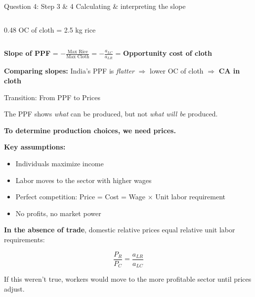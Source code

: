 \documentclass{beamer}
\begin{document}
\begin{frame}{Question 4: Step 3 \& 4 Calculating \& interpreting the slope}
\begin{columns}[T]
\begin{column}{0.48\textwidth}
\small{OC of cloth = 2.5 kg rice}
\end{column}
\end{columns}

\vspace{0.3cm}

\textbf{Slope of PPF} = $-\frac{\text{Max Rice}}{\text{Max Cloth}} = -\frac{a_{LC}}{a_{LR}}$ = \textbf{Opportunity cost of cloth}

\vspace{0.2cm}

\textbf{Comparing slopes:} India's PPF is \textit{flatter} $\Rightarrow$ lower OC of cloth $\Rightarrow$ \textbf{CA in cloth}

\end{frame}




\begin{frame}{Transition: From PPF to Prices}

The PPF shows \textit{what} can be produced, but not \textit{what will be} produced.

\vspace{0.2cm}

\textbf{To determine production choices, we need prices.}

\vspace{0.2cm}

\textbf{Key assumptions:}
\begin{itemize}
    \item Individuals maximize income
    \item Labor moves to the sector with higher wages
    \item Perfect competition: Price = Cost = Wage $\times$ Unit labor requirement
    \item No profits, no market power
\end{itemize}

\vspace{0.2cm}

\textbf{In the absence of trade}, domestic relative prices equal relative unit labor requirements:

$$\frac{P_R}{P_C} = \frac{a_{LR}}{a_{LC}}$$

\vspace{0.2cm}

\small{If this weren't true, workers would move to the more profitable sector until prices adjust.}

\end{frame}
\end{document}
